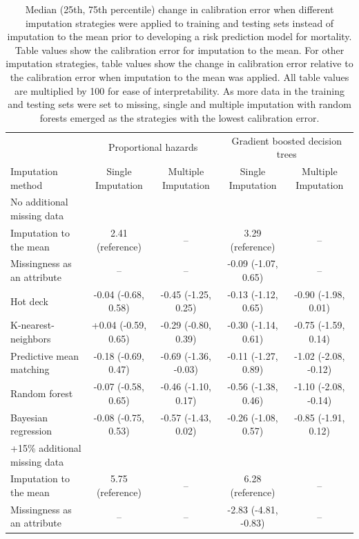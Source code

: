 \documentclass{article}
\begin{document}
\begin{table} 
 \caption{Median (25th, 75th percentile) change in calibration error when different imputation strategies were applied to training and testing sets instead of imputation to the mean prior to developing a risk prediction model for mortality. Table values show the calibration error for imputation to the mean. For other imputation strategies, table values show the change in calibration error relative to the calibration error when imputation to the mean was applied. All table values are multiplied by 100 for ease of interpretability. As more data in the training and testing sets were set to missing, single and multiple imputation with random forests emerged as the strategies with the lowest calibration error.} 
\label{tbl_md_strat_dead_cal_error} 
 
\begin{tabular}{lcccc}
\toprule
& \multicolumn{2}{c}{Proportional hazards} & \multicolumn{2}{c}{Gradient boosted decision trees} \\ 
 \cmidrule(lr){2-3}\cmidrule(lr){4-5}
Imputation method & Single Imputation & Multiple Imputation & Single Imputation & Multiple Imputation \\ 
\midrule
\multicolumn{1}{l}{No additional missing data} \\ 
\midrule
Imputation to the mean & 2.41 (reference) & -- & 3.29 (reference) & -- \\ 
Missingness as an attribute & -- & -- & -0.09 (-1.07, 0.65) & -- \\ 
Hot deck & -0.04 (-0.68, 0.58) & -0.45 (-1.25, 0.25) & -0.13 (-1.12, 0.65) & -0.90 (-1.98, 0.01) \\ 
K-nearest-neighbors & +0.04 (-0.59, 0.65) & -0.29 (-0.80, 0.39) & -0.30 (-1.14, 0.61) & -0.75 (-1.59, 0.14) \\ 
Predictive mean matching & -0.18 (-0.69, 0.47) & -0.69 (-1.36, -0.03) & -0.11 (-1.27, 0.89) & -1.02 (-2.08, -0.12) \\ 
Random forest & -0.07 (-0.58, 0.65) & -0.46 (-1.10, 0.17) & -0.56 (-1.38, 0.46) & -1.10 (-2.08, -0.14) \\ 
Bayesian regression & -0.08 (-0.75, 0.53) & -0.57 (-1.43, 0.02) & -0.26 (-1.08, 0.57) & -0.85 (-1.91, 0.12) \\ 
\midrule
\multicolumn{1}{l}{+15\% additional missing data} \\ 
\midrule
Imputation to the mean & 5.75 (reference) & -- & 6.28 (reference) & -- \\ 
Missingness as an attribute & -- & -- & -2.83 (-4.81, -0.83) & -- \\ 

\end{tabular}
\end{table}
\end{document}
